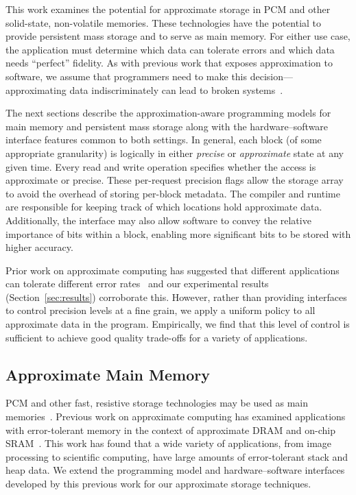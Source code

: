 \documentclass[prodmode,acmtocs]{acmsmall}
\begin{document}
This work examines the potential for approximate storage in
PCM and other solid-state, non-volatile memories.
These technologies have the potential to provide persistent mass storage
and to serve as main memory.
For either use case, the application must determine which data can
tolerate errors and which data needs ``perfect'' fidelity. As with
previous work that exposes approximation to software, we assume that
programmers need to make this decision---approximating data
indiscriminately can lead to broken systems~\cite{enerj,relax,green,truffle,npu}.

The next sections describe the approximation-aware programming
models for main memory and persistent mass storage along with
the hardware--software interface features common to both settings. 
In general,
each block (of some appropriate granularity) is logically in either
\emph{precise} or
\emph{approximate} state at any given time. Every read and write operation specifies
whether the access is approximate or precise.
These per-request precision flags allow the storage array to
avoid the overhead of storing per-block metadata. The
compiler and runtime are responsible for keeping track of which locations hold approximate
data. Additionally, the interface may also allow
software to convey the relative importance of bits within a block, enabling
more significant bits to be stored with higher accuracy.

Prior work on approximate computing has suggested that different applications
can tolerate different error rates~\cite{enerj,truffle} and our experimental
results (Section~\ref{sec:results}) corroborate this. However, rather than
providing interfaces to control precision levels at a fine grain, we apply a
uniform policy to all approximate data in the program.
Empirically, we find 
that this level of control is sufficient to achieve good quality trade-offs for
a variety of applications.

\subsection{Approximate Main Memory}

PCM and other fast, resistive storage technologies may be used 
as main memories~\cite{pcm-dram-alt,durable-pcm-mm,qureshi-pcm-mm}.
Previous work on approximate computing has examined applications with
error-tolerant memory in the context of approximate DRAM and
on-chip SRAM~\cite{flikker,enerj,truffle}. This work has found that
a wide variety of applications, from image processing to scientific
computing, have large amounts of error-tolerant stack and heap data.
We extend the programming model and hardware--software interfaces
developed by this previous work for our approximate storage
techniques.
\end{document}
